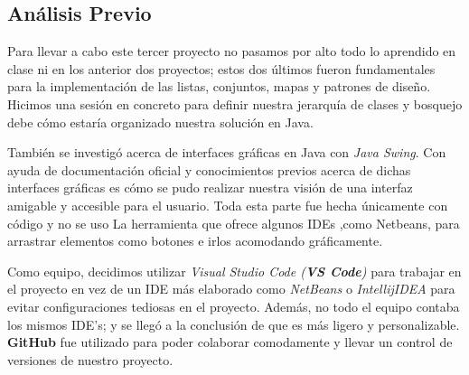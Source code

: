 \subsection*{Análisis Previo}

Para llevar a cabo este tercer proyecto no pasamos por alto todo lo aprendido en clase ni en los anterior
dos proyectos; estos dos últimos fueron fundamentales para la implementación de las listas, conjuntos, mapas
y patrones de diseño. Hicimos una sesión en concreto para definir nuestra jerarquía de clases y bosquejo debe
cómo estaría organizado nuestra solución en Java.

También se investigó acerca de interfaces gráficas en Java con \textit{Java Swing}. Con ayuda de documentación
oficial y conocimientos previos acerca de dichas interfaces gráficas es cómo se pudo realizar nuestra visión de
una interfaz amigable y accesible para el usuario. Toda esta parte fue hecha únicamente con código y no se uso La
herramienta que ofrece algunos IDEs ,como Netbeans, para arrastrar elementos como botones e irlos acomodando gráficamente.

Como equipo, decidimos utilizar \textit{Visual Studio Code (\textbf{VS Code})} para trabajar en el proyecto en vez de un IDE
más elaborado como \textit{NetBeans} o \textit{IntellijIDEA} para evitar configuraciones tediosas en el proyecto. 
Además, no todo el equipo contaba los mismos IDE's; y se llegó a la conclusión de que es más ligero y personalizable. 
\textbf{GitHub} fue utilizado para poder colaborar comodamente y llevar un control de versiones de nuestro proyecto.